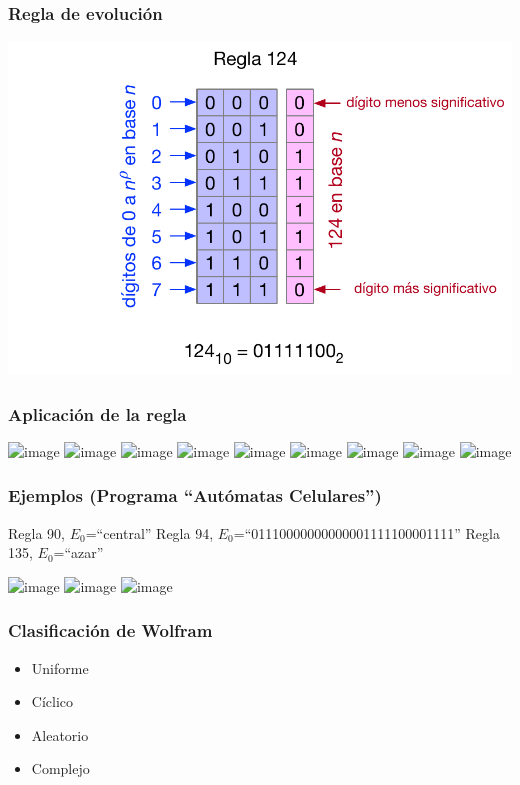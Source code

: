 \documentclass{beamer}
\begin{document}
\begin{frame}[t]
  \frametitle{Regla de evolución}
  \includegraphics[width=.9\textwidth]{automata4}
\end{frame}

\begin{frame}[t]
  \frametitle{Aplicación de la regla}
  \includegraphics<+>[width=.9\textwidth]{automata51}
  \includegraphics<+>[width=.9\textwidth]{automata52}
  \includegraphics<+>[width=.9\textwidth]{automata53}
  \includegraphics<+>[width=.9\textwidth]{automata54}
  \includegraphics<+>[width=.9\textwidth]{automata55}
  \includegraphics<+>[width=.9\textwidth]{automata56}
  \includegraphics<+>[width=.9\textwidth]{automata57}
  \includegraphics<+>[width=.9\textwidth]{automata58}
  \includegraphics<+>[width=.9\textwidth]{automata59}
\end{frame}

\begin{frame}[t]
  \frametitle{Ejemplos (Programa ``Autómatas Celulares'')}
  \begin{center}
  \only<+> {Regla 90, $E_{0}$=``central'' }
  \only<+> {Regla 94, $E_{0}$=``01110000000000001111100001111'' }
  \only<+> {Regla 135, $E_{0}$=``azar'' }
  \end{center}
  \begin{center}
  \includegraphics<1>[height=.6\textheight]{ac11}
  \includegraphics<2>[height=.6\textheight]{ac12}
  \includegraphics<3>[height=.6\textheight]{ac13}
  \end{center}
\end{frame}

\begin{frame}[t]
\frametitle{Clasificación de Wolfram}
\begin{itemize}[<+-| alert@+>]
	\item Uniforme
	\item Cíclico
	\item Aleatorio
	\item Complejo
\end{itemize}
\end{frame}
\end{document}
